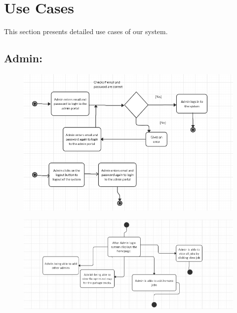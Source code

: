 \section{Use Cases}
This section presents detailed use cases of our system.
\subsection{Admin:}
\begin{figure}[!hb]
   \centering

   \includegraphics[scale=0.6]{images/Admin_1.PNG}

 

\end{figure}

\begin{figure}[!hb]
   \centering

   \includegraphics[scale=0.6]{images/Admin_3.PNG}
\end{figure}
\newpage
